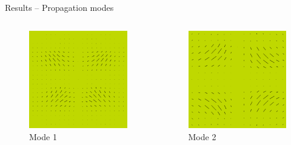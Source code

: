 \documentclass{beamer}
\begin{document}
\begin{frame}{Results -- Propagation modes}

\begin{block}{}
\begin{columns}
  \begin{column}{.45\textwidth}
  \begin{figure}[h]
    \centering
    \includegraphics[width=.8\textwidth,clip,trim=0mm 20mm 0mm 20mm]{mode_0}
    \caption{Mode 1}
  \end{figure}  
\end{column}


\begin{column}{.45\textwidth}
  \begin{figure}[h]
    \centering
    \includegraphics[width=.8\textwidth,clip,trim=0mm 20mm 0mm 20mm]{mode_1}
    \caption{Mode 2}
  \end{figure}
    \end{column}
\end{columns}
  \vspace{-15pt}


\end{block}
\end{frame}
\end{document}
